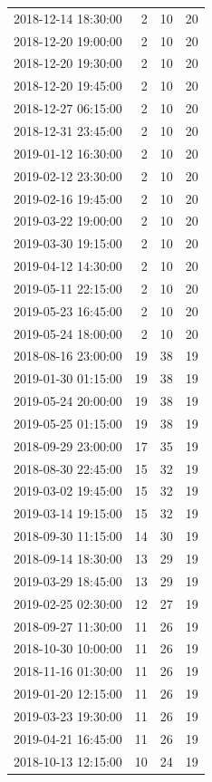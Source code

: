 \begin{tabular}{lrrr}
2018-12-14 18:30:00 & 2 & 10 & 20 \\
2018-12-20 19:00:00 & 2 & 10 & 20 \\
2018-12-20 19:30:00 & 2 & 10 & 20 \\
2018-12-20 19:45:00 & 2 & 10 & 20 \\
2018-12-27 06:15:00 & 2 & 10 & 20 \\
2018-12-31 23:45:00 & 2 & 10 & 20 \\
2019-01-12 16:30:00 & 2 & 10 & 20 \\
2019-02-12 23:30:00 & 2 & 10 & 20 \\
2019-02-16 19:45:00 & 2 & 10 & 20 \\
2019-03-22 19:00:00 & 2 & 10 & 20 \\
2019-03-30 19:15:00 & 2 & 10 & 20 \\
2019-04-12 14:30:00 & 2 & 10 & 20 \\
2019-05-11 22:15:00 & 2 & 10 & 20 \\
2019-05-23 16:45:00 & 2 & 10 & 20 \\
2019-05-24 18:00:00 & 2 & 10 & 20 \\
2018-08-16 23:00:00 & 19 & 38 & 19 \\
2019-01-30 01:15:00 & 19 & 38 & 19 \\
2019-05-24 20:00:00 & 19 & 38 & 19 \\
2019-05-25 01:15:00 & 19 & 38 & 19 \\
2018-09-29 23:00:00 & 17 & 35 & 19 \\
2018-08-30 22:45:00 & 15 & 32 & 19 \\
2019-03-02 19:45:00 & 15 & 32 & 19 \\
2019-03-14 19:15:00 & 15 & 32 & 19 \\
2018-09-30 11:15:00 & 14 & 30 & 19 \\
2018-09-14 18:30:00 & 13 & 29 & 19 \\
2019-03-29 18:45:00 & 13 & 29 & 19 \\
2019-02-25 02:30:00 & 12 & 27 & 19 \\
2018-09-27 11:30:00 & 11 & 26 & 19 \\
2018-10-30 10:00:00 & 11 & 26 & 19 \\
2018-11-16 01:30:00 & 11 & 26 & 19 \\
2019-01-20 12:15:00 & 11 & 26 & 19 \\
2019-03-23 19:30:00 & 11 & 26 & 19 \\
2019-04-21 16:45:00 & 11 & 26 & 19 \\
2018-10-13 12:15:00 & 10 & 24 & 19 \\

\end{tabular}
